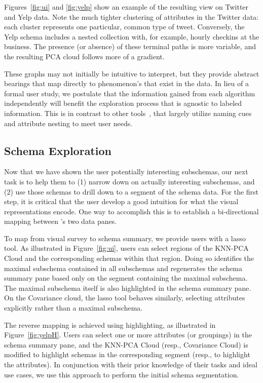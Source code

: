 \begin{example}
Figures~\ref{fig:ui} and \ref{fig:yelp} show an example of the resulting view on Twitter and Yelp data.
Note the much tighter clustering of attributes in the Twitter data: each cluster represents one particular, common type of tweet.
Conversely, the Yelp schema includes a nested collection with, for example, hourly checkins at the business.  
The presence (or absence) of these terminal paths is more variable, and the resulting PCA cloud follows more of a gradient.
\end{example}

These graphs may not initially be intuitive to interpret, but they provide abstract bearings that map directly to phenomenon’s that exist in the data. In lieu of a formal user study, we postulate that the information gained from each algorithm independently will benefit the exploration process that is agnostic to labeled information. This is in contrast to other tools~\cite{Smith:2006:FSS:1187627.1187785}, that largely utilize naming cues and attribute nesting to meet user needs.

\subsection{Schema Exploration}

Now that we have shown the user potentially interesting subschemas, our next task is to help them to (1) narrow down on actually interesting subschemas, and (2) use those schemas to drill down to a segment of the schema data.
For the first step, it is critical that the user develop a good intuition for what the visual representations encode.
One way to accomplish this is to establish a bi-directional mapping between \systemnametwo's two data panes.

To map from visual survey to schema summary, we provide users with a lasso tool.
As illustrated in Figure~\ref{fig:ui}, users can select regions of the KNN-PCA Cloud and the corresponding schemas within that region.  Doing so identifies the maximal subschema contained in all subschemas and regenerates the schema summary pane based only on the segment containing the maximal subschema.  
The maximal subschema itself is also highlighted in the schema summary pane.
On the Covariance cloud, the lasso tool behaves similarly, selecting attributes explicitly rather than a maximal subschema.

The reverse mapping is achieved using highlighting, as illustrated in Figure~\ref{fig:yelpH}.
Users can select one or more attributes (or groupings) in the schema summary pane, and the KNN-PCA Cloud (resp., Covariance Cloud) is modified to highlight schemas in the corresponding segment (resp., to highlight the attributes).
In conjunction with their prior knowledge of their tasks and ideal use cases, we use this approach to perform the initial schema segmentation.

